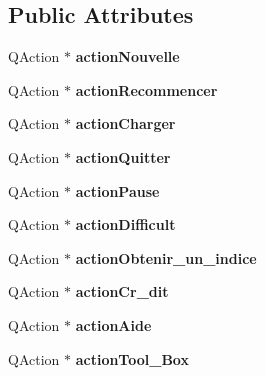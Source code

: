 \subsection*{Public Attributes}
\begin{DoxyCompactItemize}
\item 
\hypertarget{class_ui___game_aacedf2ba85e50abb9dabe41c7b8de801}{Q\-Action $\ast$ {\bfseries action\-Nouvelle}}\label{class_ui___game_aacedf2ba85e50abb9dabe41c7b8de801}

\item 
\hypertarget{class_ui___game_abeda561c4576b6723f702023bddda695}{Q\-Action $\ast$ {\bfseries action\-Recommencer}}\label{class_ui___game_abeda561c4576b6723f702023bddda695}

\item 
\hypertarget{class_ui___game_a9b0069bce40cb8a21d06c3eceb0b58ca}{Q\-Action $\ast$ {\bfseries action\-Charger}}\label{class_ui___game_a9b0069bce40cb8a21d06c3eceb0b58ca}

\item 
\hypertarget{class_ui___game_a85c7475bec7ffb211e567f21966afdfb}{Q\-Action $\ast$ {\bfseries action\-Quitter}}\label{class_ui___game_a85c7475bec7ffb211e567f21966afdfb}

\item 
\hypertarget{class_ui___game_a72053dd961a4b0e44d11c654758c5627}{Q\-Action $\ast$ {\bfseries action\-Pause}}\label{class_ui___game_a72053dd961a4b0e44d11c654758c5627}

\item 
\hypertarget{class_ui___game_a874ed7d9d7eaf4a9a56c0736772e2a1e}{Q\-Action $\ast$ {\bfseries action\-Difficult}}\label{class_ui___game_a874ed7d9d7eaf4a9a56c0736772e2a1e}

\item 
\hypertarget{class_ui___game_a9abdda11e7004f3c69f6cc7b04cd76c4}{Q\-Action $\ast$ {\bfseries action\-Obtenir\-\_\-un\-\_\-indice}}\label{class_ui___game_a9abdda11e7004f3c69f6cc7b04cd76c4}

\item 
\hypertarget{class_ui___game_adf56ebf10c7e92b33d84b5f4bcb75dbb}{Q\-Action $\ast$ {\bfseries action\-Cr\-\_\-dit}}\label{class_ui___game_adf56ebf10c7e92b33d84b5f4bcb75dbb}

\item 
\hypertarget{class_ui___game_a94dc1234b5012d19f8317f9175056b38}{Q\-Action $\ast$ {\bfseries action\-Aide}}\label{class_ui___game_a94dc1234b5012d19f8317f9175056b38}

\item 
\hypertarget{class_ui___game_a176e8aca5b1deff7597f9c9c0a32cacb}{Q\-Action $\ast$ {\bfseries action\-Tool\-\_\-\-Box}}\label{class_ui___game_a176e8aca5b1deff7597f9c9c0a32cacb}


\end{DoxyCompactItemize}
